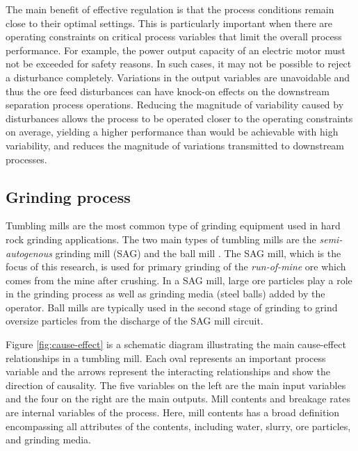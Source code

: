 The main benefit of effective regulation is that the process conditions remain close to their optimal settings. This is particularly important when there are operating constraints on critical process variables that limit the overall process performance. For example, the power output capacity of an electric motor must not be exceeded for safety reasons. In such cases, it may not be possible to reject a disturbance completely. Variations in the output variables are unavoidable and thus the ore feed disturbances can have knock-on effects on the downstream separation process operations. Reducing the magnitude of variability caused by disturbances allows the process to be operated closer to the operating constraints on average, yielding a higher performance than would be achievable with high variability, and reduces the magnitude of variations transmitted to downstream processes.

\subsection*{Grinding process}

Tumbling mills are the most common type of grinding equipment used in hard rock grinding applications. The two main types of tumbling mills are the \textit{semi-autogenous} grinding mill (SAG) and the ball mill \citep{king_chapter_2012}. The SAG mill, which is the focus of this research, is used for primary grinding of the \textit{run-of-mine} ore which comes from the mine after crushing. In a SAG mill, large ore particles play a role in the grinding process as well as grinding media (steel balls) added by the operator. Ball mills are typically used in the second stage of grinding to grind oversize particles from the discharge of the SAG mill circuit.

Figure \ref{fig:cause-effect} is a schematic diagram illustrating the main cause-effect relationships in a tumbling mill. Each oval represents an important process variable and the arrows represent the interacting relationships and show the direction of causality. The five variables on the left are the main input variables and the four on the right are the main outputs. Mill contents and breakage rates are internal variables of the process. Here, mill contents has a broad definition encompassing all attributes of the contents, including water, slurry, ore particles, and grinding media.

